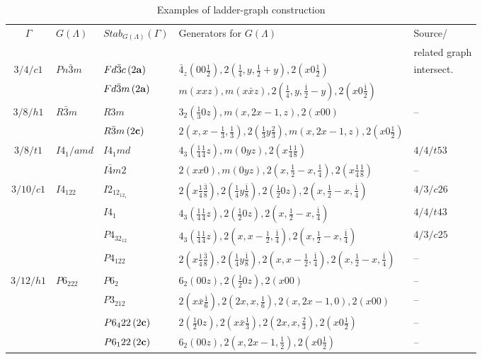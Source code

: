\documentclass[11pt,a4paper]{article}
\begin{document}
{\tiny
\begin{table}[H]
\begin{center}
\caption{Examples of ladder-graph construction}
\label{t:table5}
\begin{tabular}{|c|l|l|l|l|}
\hline
$\Gamma$ & $G(\Lambda)$ & $Stab_{G(\Lambda)}(\Gamma)$ & Generators for $G(\Lambda)$ & Source/ \\
& & & & related graph \\
\hline
\rule{0pt}{2.5ex} $3/4/c1$ & $Pn\bar3m$ & $Fd\bar3c \, (2{\bf{a}})$ & $\bar4_z(00\frac{1}{2}), 2(\frac{1}{4},y,\frac{1}{2}+y), 2(x0\frac{1}{2})$ & intersect. \\
	 &            & $Fd\bar3m \, (2{\bf{a}})$ & $m(xxz), m(x\bar{x}z), 2(\frac{1}{4}, y, \frac{\bar1}{2}-y), 2(x0\frac{\bar1}{2})$ & \cite{Blatov07} \\
$3/8/h1$ & $R\bar3m$  & $R3m$ & $3_2(\frac{1}{3}0z), m(x, 2x-1, z), 2(x00)$ & -- \\
	 &            & $R\bar3m \, (2{\bf{c}})$ & $2(x,x-\frac{1}{3},\frac{1}{3}), 2(\frac{1}{3}y\frac{2}{3}), m(x, 2x-1, z), 2(x0\frac{1}{2})$ & \cite{Blatov07} \\
$3/8/t1$ & $I4_1/amd$ & $I4_1md$ & $4_3(\frac{1}{4}\frac{1}{4}z), m(0yz), 2(x\frac{1}{4}\frac{1}{8})$ & $4/4/t53$ \\
         &            & $I\bar4m2$ & $2(xx0), m(0yz), 2(x, \frac{1}{2}-x, \frac{1}{4}), 2(x\frac{1}{4}\frac{1}{8})$ & -- \\
\rule{0pt}{2.5ex} $3/10/c1$ & $I4_122$  & $I2_12_12_1$ & $2(x\frac{1}{4}\frac{\bar3}{8}), 2(\frac{1}{4}y\frac{\bar1}{8}), 2(\frac{1}{2}0z), 2(x, \frac{1}{2}-x, \frac{\bar1}{4})$ & $4/3/c26$ \\
\rule{0pt}{2.5ex}  &  & $I4_1$ & $4_3(\frac{1}{4}\frac{1}{4}z), 2(\frac{1}{2}0z), 2(x, \frac{1}{2}-x, \frac{\bar1}{4})$ & $4/4/t43$ \\
          &           & $P4_32_12$ & $4_3(\frac{1}{4}\frac{1}{4}z), 2(x, x-\frac{1}{2}, \frac{\bar1}{4}), 2(x, \frac{1}{2}-x, \frac{\bar1}{4})$ & $4/3/c25$ \\
\rule{0pt}{2.5ex} &   & $P4_122$ & $2(x\frac{1}{4}\frac{\bar3}{8}), 2(\frac{1}{4}y\frac{\bar1}{8}), 2(x, x-\frac{1}{2}, \frac{\bar1}{4}), 2(x, \frac{1}{2}-x, \frac{\bar1}{4})$ & -- \\
\rule{0pt}{2.5ex} $3/12/h1$ & $P6_222$  & $P6_2$   & $6_2(00z), 2(\frac{1}{2}0z), 2(x00)$ & -- \\
          &           & $P3_212$ & $2(x\bar{x}\frac{\bar1}{6}), 2(2x,x,\frac{1}{6}), 2(x, 2x-1, 0), 2(x00)$ & -- \\
          &           & $P6_422 \, (2{\bf{c}})$ & $2(\frac{1}{2}0z), 2(x\bar{x}\frac{1}{3}), 2(2x, x, \frac{2}{3}), 2(x0\frac{1}{2})$ & -- \\
          &           & $P6_122 \, (2{\bf{c}})$ & $6_2(00z), 2(x, 2x-1, \frac{1}{2}), 2(x0\frac{1}{2})$ & -- \\
\hline
\end{tabular}
\end{center}
\end{table}
}
\end{document}
